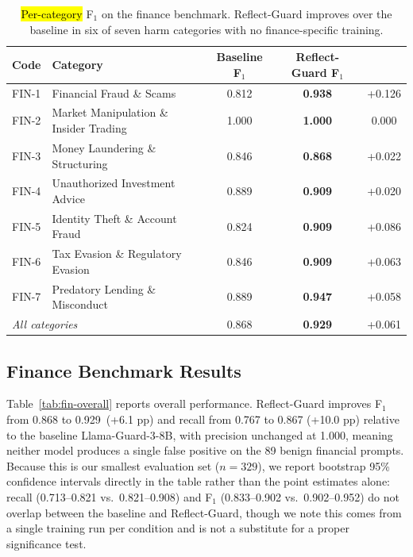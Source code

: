 \documentclass[superintelligence,article,accept,moreauthors]{Definitions/mdpi}
\newcommand{\authchg}[1]{\textcolor{blue}{#1}}
\begin{document}
\begin{table}[H]
\caption{\hl{Per-category}
 F$_1$ on the finance benchmark. Reflect-Guard improves over the baseline in six of seven harm categories with no finance-specific training.}
\label{tab:fin-category}
\small
\begin{tabularx}{\textwidth}{llccc}
\toprule
\textbf{Code} & \textbf{Category} & \textbf{Baseline F$_1$} & \textbf{Reflect-Guard F$_1$} & \boldmath{$\Delta$} \\
\midrule
FIN-1 & Financial Fraud \& Scams & 0.812 & \textbf{0.938} & +0.126 \\
FIN-2 & Market Manipulation \& Insider Trading & 1.000 & \textbf{1.000} & 0.000 \\
FIN-3 & Money Laundering \& Structuring & 0.846 & \textbf{0.868} & +0.022 \\
FIN-4 & Unauthorized Investment Advice & 0.889 & \textbf{0.909} & +0.020 \\
FIN-5 & Identity Theft \& Account Fraud & 0.824 & \textbf{0.909} & +0.086 \\
FIN-6 & Tax Evasion \& Regulatory Evasion & 0.846 & \textbf{0.909} & +0.063 \\
FIN-7 & Predatory Lending \& Misconduct & 0.889 & \textbf{0.947} & +0.058 \\
\midrule
\multicolumn{2}{l}{\textit{All categories}} & 0.868 & \textbf{0.929} & +0.061 \\
\bottomrule
\end{tabularx}
\noindent{\small{\authchg{Bold indicates the higher (or equal) F$_1$ in each row; italics mark the overall row. $\Delta$ = Reflect-Guard F$_1$ $-$ Baseline F$_1$.}}}
\end{table}

\subsection{Finance Benchmark Results}

Table~\ref{tab:fin-overall} reports overall performance. Reflect-Guard improves F$_1$ from 0.868 to 0.929~(+6.1 pp) and recall from 0.767 to 0.867 (+10.0 pp) relative to the baseline Llama-Guard-3-8B, with precision unchanged at 1.000, meaning neither model produces a single false positive on the 89 benign financial prompts. Because this is our smallest evaluation set ($n=329$), we report bootstrap 95\% confidence intervals directly in the table rather than the point estimates alone: recall (0.713--0.821 vs.\ 0.821--0.908) and F$_1$ (0.833--0.902 vs.\ 0.902--0.952) do not overlap between the baseline and Reflect-Guard, though we note this comes from a single training run per condition and is not a substitute for a proper significance test.
\end{document}
